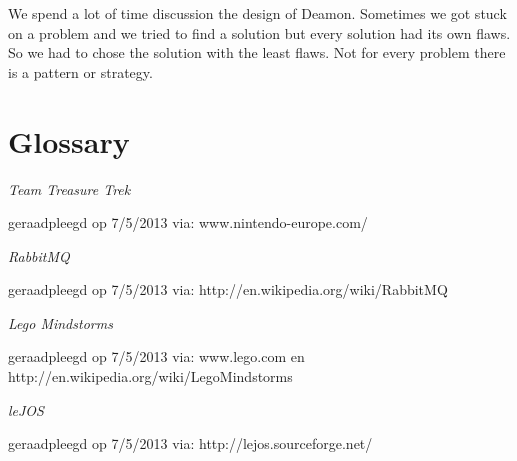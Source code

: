 \documentclass[i2]{oss}
\begin{document}
We spend a lot of time discussion the design of Deamon. Sometimes we got stuck on a problem and we tried to find a solution but every solution had its own flaws. So we had to chose the solution with the least flaws. Not for every problem there is a pattern or strategy. 
\\








\section{Glossary}
\label{ssec:glossary}

\begin{description}
\item 
\end{description}

\newpage
\begin{flushleft}
\begin{thebibliography}{9}

\textit{Team Treasure Trek}
\begin{scriptsize}
geraadpleegd op 7/5/2013 via: \mbox{www.nintendo-europe.com/}
\end{scriptsize}

\textit{RabbitMQ}
\begin{scriptsize}
geraadpleegd op 7/5/2013 via: \mbox{http://en.wikipedia.org/wiki/RabbitMQ}
\end{scriptsize}

\textit{Lego Mindstorms}
\begin{scriptsize}
geraadpleegd op 7/5/2013 via: \mbox{www.lego.com} en \mbox{http://en.wikipedia.org/wiki/Lego\textendash Mindstorms}
\end{scriptsize}

\textit{leJOS}
\begin{scriptsize}
geraadpleegd op 7/5/2013 via: \mbox{http://lejos.sourceforge.net/}
\end{scriptsize}


\end{thebibliography}
\end{flushleft}
\end{document}
